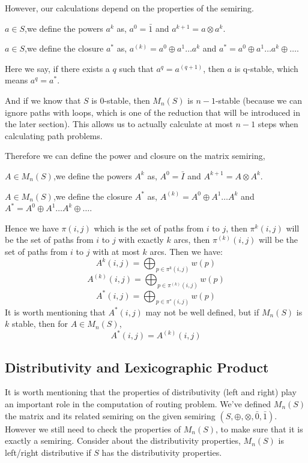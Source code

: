 \documentclass[a4paper,12pt,twoside,openright]{report}
\begin{document}
However, our calculations depend on the properties of the semiring.

$a\in S$,we define the powers $a^k$ as, $a^0 = \bar{1}$ and $a^{k+1} = a \otimes a^k$.

$a\in S$,we define the closure $a^*$ as, $a^{(k)} = a^0 \oplus a^1 \dots  a^k$ and $a^* = a^0 \oplus a^1 \dots  a^k \oplus \dots$.

Here we say, if there exists a $q$ such that $a^{q} = a^{(q+1)}$, then $a$ is q-stable, which means $a^{q} = a^*$.

And if we know that $S$ is 0-stable, then $M_n(S)$ is $n-1$-stable (because we can ignore paths with loops, which is one of the reduction that will be introduced in the later section). 
This allows us to actually calculate at most $n-1$ steps when calculating path problems.

Therefore we can define the power and closure on the matrix semiring,

$A\in M_n(S)$,we define the powers $A^k$ as, $A^0 = \bar{I}$ and $A^{k+1} = A \otimes A^k$.

$A\in M_n(S)$,we define the closure $A^*$ as, $A^{(k)} = A^0 \oplus A^1 \dots  A^k$ and $A^* = A^0 \oplus A^1 \dots  A^k \oplus \dots$.


Hence we have $\pi(i,j)$ which is the set of paths from $i$ to $j$, then $\pi^k(i,j)$ will be the set of paths from $i$ to $j$ with exactly $k$ arcs, then $\pi^{(k)}(i,j)$ will be the set of paths from $i$ to $j$ with at most $k$ arcs. Then we have:
\[A^k(i,j) = \bigoplus_{p \in \pi^k (i,j)}w(p)\]
\[A^{(k)}(i,j) = \bigoplus_{p \in \pi^{(k)} (i,j)}w(p)\]
\[A^*(i,j) = \bigoplus_{p \in \pi^* (i,j)}w(p)\]
It is worth mentioning that $A^*(i,j)$ may not be well defined, but if $M_n(S)$ is $k$ stable, then for $A\in M_n(S)$, \[A^*(i,j) = A^{(k)}(i,j)\]

\subsection{Distributivity and Lexicographic Product}
It is worth mentioning that the properties of distributivity (left and right) play an important role in the computation of routing problem.
We've defined $M_n(S)$ the matrix and its related semiring on the given semiring $(S,\oplus,\otimes,\bar0,\bar1)$.
However we still need to check the properties of $M_n(S)$, to make sure that it is exactly a semiring.
Consider about the distributivity properties, $M_n(S)$ is left/right distributive if $S$ has the distributivity properties.
\end{document}
